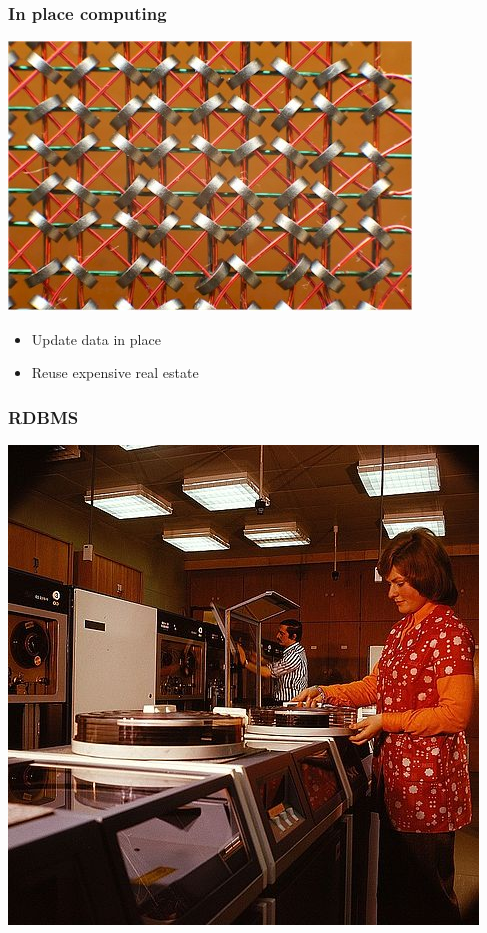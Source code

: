 \documentclass[11pt]{article}
\begin{document}
\subsubsection*{In place computing}
\label{sec:orgheadline9}

\includegraphics[width=.9\linewidth]{./core_memory.jpg}

\begin{itemize}
\item Update data in place
\end{itemize}
\begin{itemize}
\item Reuse expensive real estate
\end{itemize}

\subsubsection*{RDBMS}
\label{sec:orgheadline10}

\includegraphics[width=.9\linewidth]{./disk-pack.jpg}
\end{document}

